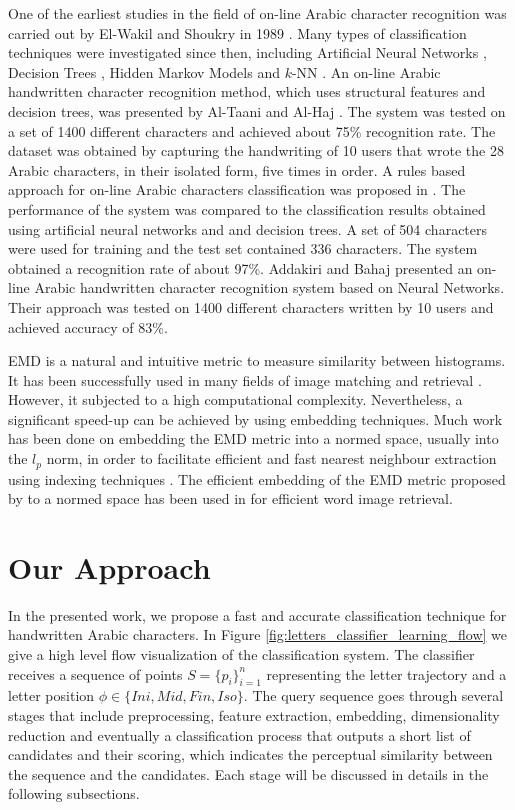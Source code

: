\documentclass[10pt, conference, compsocconf]{IEEEtran}
\begin{document}
One of the earliest studies in the field of on-line Arabic character recognition was carried out by El-Wakil and Shoukry in 1989 \cite{el1989line}.
Many types of classification techniques were investigated since then, including Artificial Neural Networks \cite{alijla2012oiahcr,ismail2012online}, Decision Trees \cite{ismail2012online, al2010recognition, omer2010online}, Hidden Markov Models \cite{biadsy2006online} and $k$-NN \cite{elglaly2011isolated}.
An on-line Arabic handwritten character recognition method, which uses structural features and decision trees, was presented by Al-Taani and Al-Haj \cite{al2010recognition}. 
The system was tested on a set of 1400 different characters and achieved about 75\% recognition rate. 
The dataset was obtained by capturing the handwriting of 10 users that wrote the 28 Arabic characters, in their isolated form, five times in order.
A rules based approach for on-line Arabic characters classification was proposed in \cite{ismail1859online}. 
The performance of the system was compared to the classification results obtained using artificial neural networks and and decision trees. 
A set of 504 characters were used for training and the test set contained 336 characters. 
The system obtained a recognition rate of about 97\%. 
Addakiri and Bahaj \cite{addakiri2012line} presented an on-line Arabic handwritten character
recognition system based on Neural Networks. 
Their approach was tested on 1400 different characters written by 10 users and achieved accuracy of 83\%.

EMD is a natural and intuitive metric to measure similarity between histograms. 
It has been successfully used in many fields of image matching and retrieval \cite{grauman2004fast, rubner2000earth}.
However, it subjected to a high computational complexity.
Nevertheless, a significant speed-up can be achieved by using embedding techniques.
Much work has been done on embedding the EMD metric into a normed space, usually into the $l_p$ norm, in order to facilitate efficient and fast nearest neighbour extraction using indexing techniques \cite{bourgain1985lipschitz}. 
The efficient embedding of the EMD metric proposed by \cite{shirdhonkar2008approximate} to a normed space has been used in \cite{saabni2013efficient} for efficient word image retrieval.

\section{Our Approach}
\label{sec:approach}
In the presented work, we propose a fast and accurate classification technique for handwritten Arabic characters.
In Figure \ref{fig:letters_classifier_learning_flow} we give a high level flow visualization of the classification system.
The classifier receives a sequence of points $S=\{p_{i}\}_{i=1}^{n}$ representing the letter trajectory and a letter position $\phi \in \{Ini, Mid, Fin, Iso\}$.
The query sequence goes through several stages that include preprocessing, feature extraction, embedding, dimensionality reduction and eventually a classification process that outputs a short list of candidates and their scoring, which indicates the perceptual similarity between the sequence and the candidates. 
Each stage will be discussed in details in the following subsections.
\end{document}
